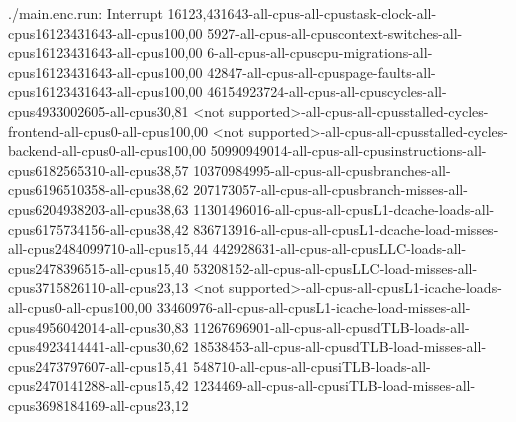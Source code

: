 ./main.enc.run: Interrupt
16123,431643-all-cpus-all-cpustask-clock-all-cpus16123431643-all-cpus100,00
5927-all-cpus-all-cpuscontext-switches-all-cpus16123431643-all-cpus100,00
6-all-cpus-all-cpuscpu-migrations-all-cpus16123431643-all-cpus100,00
42847-all-cpus-all-cpuspage-faults-all-cpus16123431643-all-cpus100,00
46154923724-all-cpus-all-cpuscycles-all-cpus4933002605-all-cpus30,81
<not supported>-all-cpus-all-cpusstalled-cycles-frontend-all-cpus0-all-cpus100,00
<not supported>-all-cpus-all-cpusstalled-cycles-backend-all-cpus0-all-cpus100,00
50990949014-all-cpus-all-cpusinstructions-all-cpus6182565310-all-cpus38,57
10370984995-all-cpus-all-cpusbranches-all-cpus6196510358-all-cpus38,62
207173057-all-cpus-all-cpusbranch-misses-all-cpus6204938203-all-cpus38,63
11301496016-all-cpus-all-cpusL1-dcache-loads-all-cpus6175734156-all-cpus38,42
836713916-all-cpus-all-cpusL1-dcache-load-misses-all-cpus2484099710-all-cpus15,44
442928631-all-cpus-all-cpusLLC-loads-all-cpus2478396515-all-cpus15,40
53208152-all-cpus-all-cpusLLC-load-misses-all-cpus3715826110-all-cpus23,13
<not supported>-all-cpus-all-cpusL1-icache-loads-all-cpus0-all-cpus100,00
33460976-all-cpus-all-cpusL1-icache-load-misses-all-cpus4956042014-all-cpus30,83
11267696901-all-cpus-all-cpusdTLB-loads-all-cpus4923414441-all-cpus30,62
18538453-all-cpus-all-cpusdTLB-load-misses-all-cpus2473797607-all-cpus15,41
548710-all-cpus-all-cpusiTLB-loads-all-cpus2470141288-all-cpus15,42
1234469-all-cpus-all-cpusiTLB-load-misses-all-cpus3698184169-all-cpus23,12
